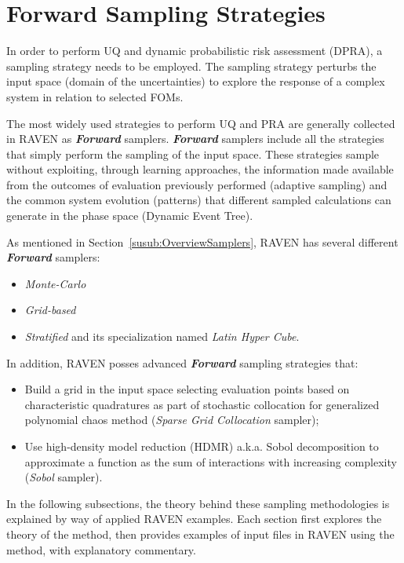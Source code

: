 \section{Forward Sampling Strategies}
\label{sec:forwardSamplingStrategies}
In order to perform UQ and dynamic
probabilistic risk assessment (DPRA),
a sampling strategy needs to be employed. The sampling strategy
perturbs the input space (domain of the uncertainties) to explore
the response of a complex system in relation to selected FOMs.

The most widely used strategies to perform UQ and PRA are generally
collected in RAVEN as \textit{\textbf{Forward}} samplers. \textit{\textbf{Forward}} samplers include
all the strategies that simply perform the sampling of the input space.  These strategies sample
without exploiting, through learning approaches,
the information made available from the outcomes of evaluation previously performed (adaptive sampling) and the
common system evolution (patterns) that different sampled calculations can generate in the phase space (Dynamic Event Tree).

As mentioned in Section~\ref{susub:OverviewSamplers}, RAVEN has
several different \textit{\textbf{Forward}} samplers:
\begin{itemize}
  \item \textit{Monte-Carlo}
  \item \textit{Grid-based}
  \item \textit{Stratified} and its specialization named \textit{Latin Hyper Cube}.
\end{itemize}
In addition, RAVEN posses advanced \textit{\textbf{Forward}} sampling strategies that:
\begin{itemize}
  \item Build a grid in the input space selecting evaluation points
    based on characteristic quadratures as part of stochastic collocation
    for generalized polynomial chaos method (\textit{Sparse
    Grid Collocation} sampler);
  \item Use high-density model reduction (HDMR) a.k.a. Sobol
    decomposition to approximate a function as the sum of
    interactions with increasing complexity (\textit{Sobol} sampler).
\end{itemize}
In the following subsections, the theory behind these sampling
methodologies is explained by way of applied RAVEN
examples.  Each section first explores the theory of the method, then provides examples of input files
in RAVEN using the method, with explanatory commentary.
